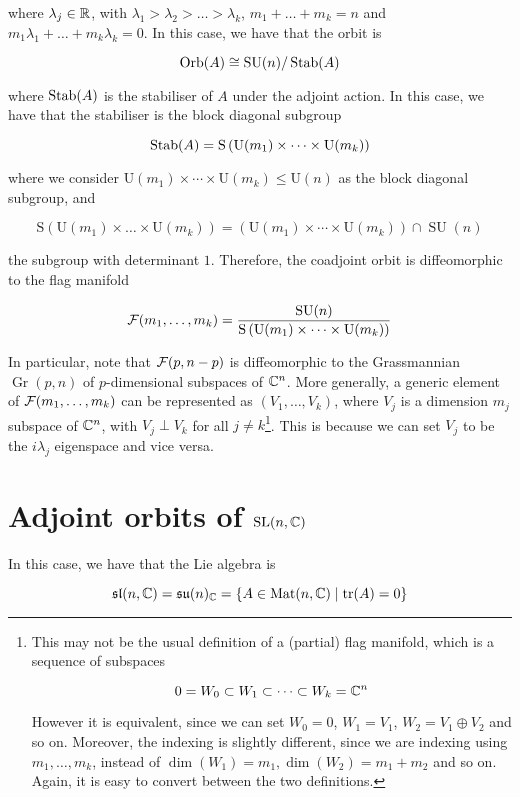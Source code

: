 \documentclass{article}
\renewcommand{\sl}{\mfs\mfl}
\DeclareMathOperator{\SU}{SU}
\newcommand{\su}{\mfs\mfu}
\newcommand{\rS}{\mathrm{S}}
\newcommand{\rU}{\mathrm{U}}
\DeclareMathOperator{\Gr}{Gr}
\begin{document}
where \(\lambda_j \in \mathbb{R}\), with \(\lambda_1 > \lambda_2 > \dots > \lambda_k\), \(m_1 + \dots + m_k = n\) and \(m_1\lambda_1 + \dots + m_k\lambda_k = 0\). In this case, we have that the orbit is

\[\Orb(A) \cong \SU(n)/\Stab(A)\]

where \(\operatorname{Stab}(A)\) is the stabiliser of \(A\) under the adjoint action. In this case, we have that the stabiliser is the block diagonal subgroup

\[\Stab(A) = \rS\left(\rU(m_1) \times \dots \times \rU(m_k)\right)\]

where we consider \(\rU(m_1) \times \cdots \times \rU(m_k) \le \rU(n)\) as the block diagonal subgroup, and

\[\rS\left(\rU(m_1) \times \dots \times \rU(m_k)\right) = \left(\rU(m_1) \times \cdots \times \rU(m_k)\right) \cap \SU(n)\]

the subgroup with determinant \(1\). Therefore, the coadjoint orbit is diffeomorphic to the flag manifold

\[\mcF(m_1, \dots, m_k) = \frac{\SU(n)}{\rS\left(\rU(m_1) \times \cdots \times \rU(m_k)\right)}\]

In particular, note that \(\mathcal{F}(p, n-p)\) is diffeomorphic to the Grassmannian \(\Gr(p, n)\) of \(p\)-dimensional subspaces of \(\mathbb{C}^n\). More generally, a generic element of \(\mathcal{F}(m_1, \dots, m_k)\) can be represented as \((V_1, \dots, V_k)\), where \(V_j\) is a dimension \(m_j\) subspace of \(\mathbb{C}^n\), with \(V_j \perp V_k\) for all \(j \ne k\)\footnote{This may not be the usual definition of a (partial) flag manifold, which is a sequence of subspaces 

\[0 = W_0 \subset W_1 \subset \cdots \subset W_k = \mathbb{C}^n\]

However it is equivalent, since we can set \(W_0 = 0\), \(W_1 = V_1\), \(W_2 = V_1 \oplus V_2\) and so on. Moreover, the indexing is slightly different, since we are indexing using \(m_1, \dots, m_k\), instead of \(\dim(W_1) = m_1, \dim(W_2) = m_1 + m_2\) and so on. Again, it is easy to convert between the two definitions.}. This is because we can set \(V_j\) to be the \(i\lambda_j\) eigenspace and vice versa.

\section{Adjoint orbits of \(\operatorname{SL}(n, \mathbb{C})\)}

In this case, we have that the Lie algebra is

\[\sl(n, \C) = \su(n)_\C = \left\{A \in \Mat(n, \C) \mid \tr(A) = 0\right\}\]
\end{document}

